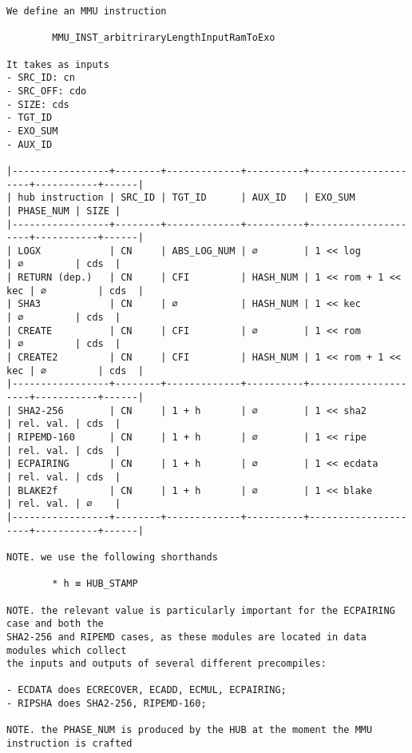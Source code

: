 \documentclass[varwidth=\maxdimen,margin=0.5cm,multi={verbatim}]{standalone}
\begin{document}
\begin{verbatim}
We define an MMU instruction

        MMU_INST_arbitriraryLengthInputRamToExo

It takes as inputs
- SRC_ID: cn
- SRC_OFF: cdo
- SIZE: cds
- TGT_ID
- EXO_SUM
- AUX_ID

|-----------------+--------+-------------+----------+---------------------+-----------+------|
| hub instruction | SRC_ID | TGT_ID      | AUX_ID   | EXO_SUM             | PHASE_NUM | SIZE |
|-----------------+--------+-------------+----------+---------------------+-----------+------|
| LOGX            | CN     | ABS_LOG_NUM | ∅        | 1 << log            | ∅         | cds  |
| RETURN (dep.)   | CN     | CFI         | HASH_NUM | 1 << rom + 1 << kec | ∅         | cds  |
| SHA3            | CN     | ∅           | HASH_NUM | 1 << kec            | ∅         | cds  |
| CREATE          | CN     | CFI         | ∅        | 1 << rom            | ∅         | cds  |
| CREATE2         | CN     | CFI         | HASH_NUM | 1 << rom + 1 << kec | ∅         | cds  |
|-----------------+--------+-------------+----------+---------------------+-----------+------|
| SHA2-256        | CN     | 1 + h       | ∅        | 1 << sha2           | rel. val. | cds  |
| RIPEMD-160      | CN     | 1 + h       | ∅        | 1 << ripe           | rel. val. | cds  |
| ECPAIRING       | CN     | 1 + h       | ∅        | 1 << ecdata         | rel. val. | cds  |
| BLAKE2f         | CN     | 1 + h       | ∅        | 1 << blake          | rel. val. | ∅    |
|-----------------+--------+-------------+----------+---------------------+-----------+------|

NOTE. we use the following shorthands

        * h ≡ HUB_STAMP

NOTE. the relevant value is particularly important for the ECPAIRING case and both the
SHA2-256 and RIPEMD cases, as these modules are located in data modules which collect 
the inputs and outputs of several different precompiles:

- ECDATA does ECRECOVER, ECADD, ECMUL, ECPAIRING;
- RIPSHA does SHA2-256, RIPEMD-160;

NOTE. the PHASE_NUM is produced by the HUB at the moment the MMU instruction is crafted
\end{verbatim}
\end{document}
